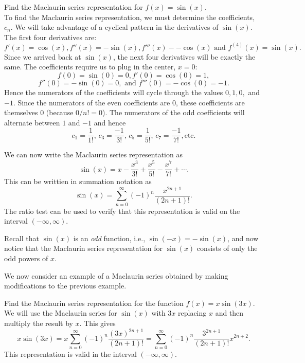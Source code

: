 \documentclass[handout]{ximera}
\begin{document}
\begin{example} 
Find the Maclaurin series representation for $f(x) = \sin(x)$.\\
To find the Maclaurin series representation, we must determine the coefficients, $c_n$. 
We will take advantage of a cyclical pattern in the derivatives of $\sin(x)$.
The first four derivatives are:
\[
f'(x) = \cos(x), f''(x) = -\sin(x), f'''(x) - -\cos(x) \text{ and } f^{(4)}(x) = \sin(x).
\]
Since we arrived back at $\sin(x)$, the next four derivatives will be exactly the same.
The coefficients require us to plug in the center, $x = 0$:
\[
f(0) = \sin(0) = 0, f'(0) = \cos(0) = 1,
\]
\[
 f''(0) = -\sin(0) = 0, \text{ and } f'''(0) = -\cos(0) = -1.
\]
Hence the numerators of the coefficients will cycle through the values $0, 1, 0,$ and $-1$.
Since the numerators of the even coefficients are 0, these coefficients are themselves 0 (because $0/n! = 0$).
The numerators of the odd coefficients will alternate between $1$ and $-1$ and hence 
\[
c_1 = \frac{1}{1!},\, c_3 = \frac{-1}{3!},\, c_5 = \frac{1}{5!}, \, c_7 = \frac{-1}{7!}, \text{etc}.
\]

We can now write the Maclaurin series representation as
\[
\sin(x) =  x - \frac{x^3}{3!} + \frac{x^5}{5!} - \frac{x^7}{7!} + \cdots.
\]
This can be writtien in summation notation as
\[
\sin(x) = \sum_{n=0}^\infty (-1)^n\frac{x^{2n+1}}{(2n+1)!}.
\]
The ratio test can be used to verify that this representation is valid on the interval $(-\infty, \infty)$.
\begin{remark}
Recall that $\sin(x)$ is an \textit{odd} function, 
i.e., $\sin(-x) = -\sin(x)$, and now notice that the Maclaurin series representation for $\sin(x)$ consists of only the 
odd powers of $x$. 
\end{remark}
\end{example}


We now consider an example of a Maclaurin series obtained by making modifications to the previous example.


\begin{example}[example 5]
Find the Maclaurin series representation for the function $f(x) = x\sin(3x)$.\\
We will use the Maclaurin series for $\sin(x)$ with $3x$ replacing $x$ and then multiply the result by $x$.
This gives
\[
x\sin(3x) = x \sum_{n=0}^\infty (-1)^n\frac{(3x)^{2n+1}}{(2n+1)!} = \sum_{n=0}^\infty (-1)^n \frac{3^{2n+1}}{(2n+1)!}x^{2n+2}.
\]
This representation is valid in the interval $(-\infty, \infty)$.
\end{example}
\end{document}
